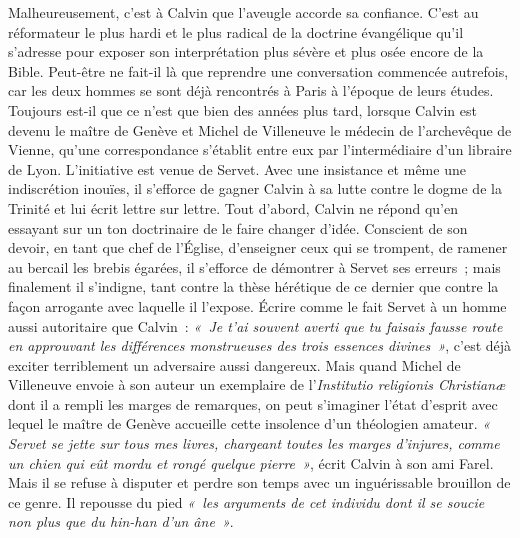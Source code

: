 \documentclass[french,twoside]{book} %
\begin{document}
Malheureusement, c’est à Calvin que l’aveugle accorde sa confiance. C’est au réformateur le plus hardi et le plus radical de la doctrine évangélique qu’il s’adresse pour exposer son interprétation plus sévère et plus osée encore de la Bible. Peut-être ne fait-il là que reprendre une conversation commencée autrefois, car les deux hommes se sont déjà rencontrés à Paris à l’époque de leurs études. Toujours est-il que ce n’est que bien des années plus tard, lorsque Calvin est devenu le maître de Genève et Michel de Villeneuve le médecin de l’archevêque de Vienne, qu’une correspondance s’établit entre eux par l’intermédiaire d’un libraire de Lyon. L’initiative est venue de Servet. Avec une insistance et même une indiscrétion inouïes, il s’efforce de gagner Calvin à sa lutte contre le dogme de la Trinité et lui écrit lettre sur lettre. Tout d’abord, Calvin ne répond qu’en essayant sur un ton doctrinaire de le faire changer d’idée. Conscient de son devoir, en tant que chef de l’Église, d’enseigner ceux qui se trompent, de ramener au bercail les brebis égarées, il s’efforce de démontrer à Servet ses erreurs ; mais finalement il s’indigne, tant contre la thèse hérétique de ce dernier que contre la façon arrogante avec laquelle il l’expose. Écrire comme le fait Servet à un homme aussi autoritaire que Calvin : \emph{« Je t’ai souvent averti que tu faisais fausse route en approuvant les différences monstrueuses des trois essences divines »}, c’est déjà exciter terriblement un adversaire aussi dangereux. Mais quand Michel de Villeneuve envoie à son auteur un exemplaire de l’\emph{Institutio religionis Christianæ} dont il a rempli les marges de remarques, on peut s’imaginer l’état d’esprit avec lequel le maître de Genève accueille cette insolence d’un théologien amateur. \emph{« Servet se jette sur tous mes livres, chargeant toutes les marges d’injures, comme un chien qui eût mordu et rongé quelque pierre »}, écrit Calvin à son ami Farel. Mais il se refuse à disputer et perdre son temps avec un inguérissable brouillon de ce genre. Il repousse du pied \emph{« les arguments de cet individu dont il se soucie non plus que du hin-han d’un âne »}.\par
\end{document}
